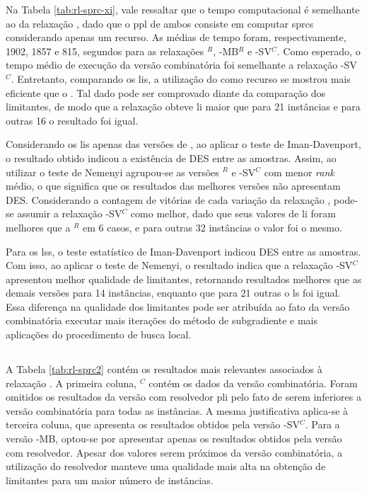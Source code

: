 Na  Tabela \ref{tab:rl-sprc-xi},  vale  ressaltar que  o  tempo computacional  é
semelhante ao  da relaxação {\rld},  dado que o  \gls{ppl} de ambos  consiste em
computar \gls{sprc}s considerando  apenas um recurso. As médias  de tempo foram,
respectivamente, 1902,  1857 e  815, segundos  para as  relaxações {\rlt}$^{R}$,
{\rlt}-MB$^{R}$ e {\rlt}-SV$^{C}$.  Como esperado, o tempo médio  de execução da
versão  combinatória foi  semelhante  a  relaxação {\rld}-SV$^{C}$.  Entretanto,
comparando os \gls{li}s, a utilização do  {\jitter} como recurso se mostrou mais
eficiente que o {\delay}. Tal dado  pode ser comprovado diante da comparação dos
limitantes, de modo que a relaxação {\rlt} obteve \gls{li} maior que {\rld} para
21 instâncias e para outras 16 o resultado foi igual.

Considerando os  \gls{li}s apenas das versões  de {\rlt}, ao aplicar  o teste de
Iman-Davenport,  o  resultado  obtido  indicou  a existência  de  DES  entre  as
amostras. Assim, ao utilizar o teste de Nemenyi agrupou-se as versões {\rlt}$^R$
e {\rlt}-SV$^C$  com menor {\em rank}  médio, o que significa  que os resultados
das melhores versões não apresentam DES.  Considerando a contagem de vitórias de
cada variação da  relaxação {\rlt}, pode-se assumir  a relaxação {\rlt}-SV$^{C}$
como melhor, dado  que seus valores de \gls{li} foram  melhores que a {\rlt}$^R$
em 6 casos, e para outras 32 instâncias o valor foi o mesmo.

Para os  \gls{ls}s, o teste estatístico  de Iman-Davenport indicou DES  entre as
amostras. Com  isso, ao  aplicar o teste  de Nemenyi, o  resultado indica  que a
relaxação {\rld}-SV$^C$  apresentou melhor  qualidade de  limitantes, retornando
resultados melhores que as demais versões  para 14 instâncias, enquanto que para
21 outras o \gls{ls} foi igual.  Essa diferença na qualidade dos limitantes pode
ser atribuída ao  fato da versão combinatória executar mais  iterações do método
de subgradiente e mais aplicações do procedimento de busca local.

\subsection{\rlq}

A Tabela  \ref{tab:rl-sprc2} contém os  resultados mais relevantes  associados à
relaxação  {\rlq}. A  primeira  coluna,  {\rlq}$^C$ contém  os  dados da  versão
combinatória. Foram  omitidos os resultados  da versão com  resolvedor \gls{pli}
pelo fato de serem inferiores a  versão combinatória para todas as instâncias. A
mesma justificativa  aplica-se à  terceira coluna,  que apresenta  os resultados
obtidos  pela versão  {\rlq}-SV$^{C}$.  Para a  versão  {\rlq}-MB, optou-se  por
apresentar apenas os  resultados obtidos pela versão com  resolvedor. Apesar dos
valores  serem  próximos da  versão  combinatória,  a utilização  do  resolvedor
manteve uma qualidade  mais alta na obtenção de limitantes  para um maior número
de instâncias.

